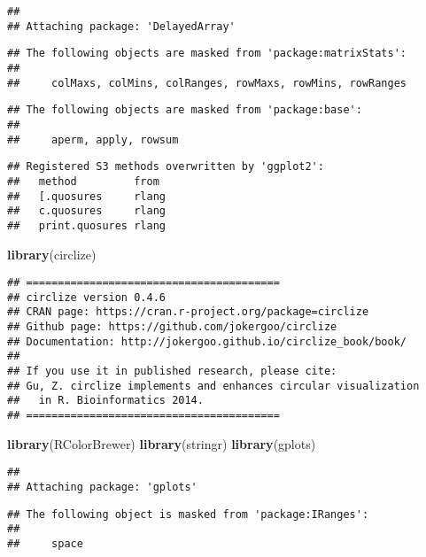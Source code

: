 \documentclass[]{article}
\newenvironment{Shaded}{\begin{snugshade}}{\end{snugshade}}
\newcommand{\KeywordTok}[1]{\textcolor[rgb]{0.13,0.29,0.53}{\textbf{#1}}}
\newcommand{\NormalTok}[1]{#1}
\begin{document}
\begin{verbatim}
## 
## Attaching package: 'DelayedArray'
\end{verbatim}

\begin{verbatim}
## The following objects are masked from 'package:matrixStats':
## 
##     colMaxs, colMins, colRanges, rowMaxs, rowMins, rowRanges
\end{verbatim}

\begin{verbatim}
## The following objects are masked from 'package:base':
## 
##     aperm, apply, rowsum
\end{verbatim}

\begin{verbatim}
## Registered S3 methods overwritten by 'ggplot2':
##   method         from 
##   [.quosures     rlang
##   c.quosures     rlang
##   print.quosures rlang
\end{verbatim}

\begin{Shaded}
\begin{Highlighting}[]
\KeywordTok{library}\NormalTok{(circlize)}
\end{Highlighting}
\end{Shaded}

\begin{verbatim}
## ========================================
## circlize version 0.4.6
## CRAN page: https://cran.r-project.org/package=circlize
## Github page: https://github.com/jokergoo/circlize
## Documentation: http://jokergoo.github.io/circlize_book/book/
## 
## If you use it in published research, please cite:
## Gu, Z. circlize implements and enhances circular visualization 
##   in R. Bioinformatics 2014.
## ========================================
\end{verbatim}

\begin{Shaded}
\begin{Highlighting}[]
\KeywordTok{library}\NormalTok{(RColorBrewer)}
\KeywordTok{library}\NormalTok{(stringr)}
\KeywordTok{library}\NormalTok{(gplots)}
\end{Highlighting}
\end{Shaded}

\begin{verbatim}
## 
## Attaching package: 'gplots'
\end{verbatim}

\begin{verbatim}
## The following object is masked from 'package:IRanges':
## 
##     space
\end{verbatim}
\end{document}
